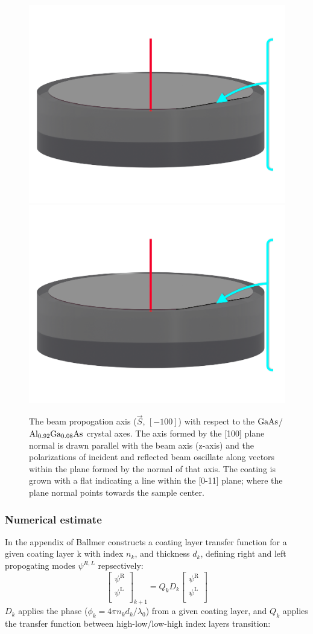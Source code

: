 \begin{figure}[!ht]
    \begin{subcaptiongroup}
	    \includegraphics[width=.55\textwidth,page=1]{figs/ALGAAS/ALGAAS_HR_layers_1.pdf}
	    \label{HRiso}
	    \includegraphics[width=.55\textwidth,page=2]{figs/ALGAAS/ALGAAS_HR_layers_1.pdf}
	    \label{HRxsection}
    \end{subcaptiongroup}
\caption{The beam propogation axis ($\vec{S}$, $[-100]$) with respect to the $\mathrm{GaAs}$/$\mathrm{Al_{0.92}Ga_{0.08}As}$ crystal axes. The axis formed by the [100] plane normal is drawn parallel with the beam axis (z-axis) and the polarizations of incident and reflected beam oscillate along vectors within the plane formed by the normal of that axis. The coating is grown with a flat indicating a line within the [0-11] plane; where the plane normal points towards the sample center.}
\label{fig:HRlayers}
\end{figure}


\subsubsection{Numerical estimate}

In the appendix of \cite{ballmer2015} Ballmer constructs a coating layer transfer function for a given coating layer k with index $n_k$, and thickness $d_k$, defining right and left propogating modes $\psi^{R,L}$ repsectively:
$$
  \left[ {\begin{array}{c}
   \psi^\mathrm{R} \\
   \psi^\mathrm{L} \\
  \end{array} } \right]_{k+1}
  =
%
Q_k D_k
%
 \left[{\begin{array}{c}
   \psi^\mathrm{R} \\
   \psi^\mathrm{L} \\
 \end{array}} \right]
$$
\noindent $D_k$ applies the phase ($\phi_k = 4\pi n_k d_k /\lambda_0$) from a given coating layer, and $Q_k$ applies the transfer function between high-low/low-high index layers transition:

